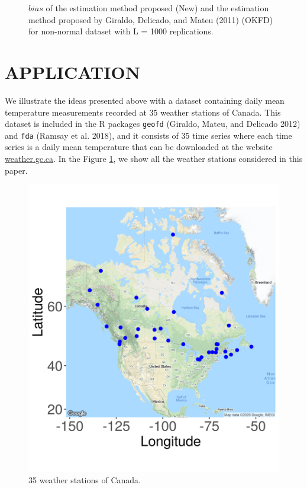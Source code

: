 \documentclass[12pt,]{article}
\theoremstyle{definition}
\theoremstyle{definition}
\theoremstyle{definition}
\theoremstyle{remark}
\begin{document}
\begin{figure}[htbp]
    \caption{$bias$ of the estimation method proposed (New) and the estimation method proposed by Giraldo, Delicado, and Mateu (2011) (OKFD) for non-normal dataset with L = 1000 replications.}
\end{figure}

\newpage

\hypertarget{sec:application}{%
\section{APPLICATION}\label{sec:application}}

We illustrate the ideas presented above with a dataset containing daily mean temperature measurements recorded at \(35\) weather stations of Canada. This dataset is included in the R packages \texttt{geofd} (Giraldo, Mateu, and Delicado 2012) and \texttt{fda} (Ramsay et al. 2018), and it consists of 35 time series where each time series is a daily mean temperature that can be downloaded at the website \href{https://weather.gc.ca/}{weather.gc.ca}. In the Figure \ref{fig:weather-stations}, we show all the weather stations
considered in this paper.

\begin{figure}[!htbp]
    \centering

\begin{center}\includegraphics[width=0.45\linewidth]{figure/map_stations_canada} \end{center}
    \caption{35 weather stations  of Canada.}
    \label{fig:weather-stations}
\end{figure}
\end{document}
